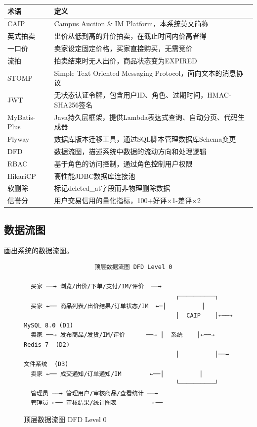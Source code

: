 \documentclass[12pt,a4paper]{ctexart}
\numberwithin{figure}{section}
\numberwithin{table}{section}
\begin{document}
\begin{center}
\renewcommand{\arraystretch}{1.3}
\begin{tabular}{|p{4cm}|p{10cm}|}
\hline
\rowcolor{tableheader}
\textbf{术语} & \textbf{定义} \\
\hline
CAIP & Campus Auction \& IM Platform，本系统英文简称 \\
\hline
英式拍卖 & 出价从低到高的升价拍卖，在截止时间内价高者得 \\
\hline
一口价 & 卖家设定固定价格，买家直接购买，无需竞价 \\
\hline
流拍 & 拍卖结束时无人出价，商品状态变为EXPIRED \\
\hline
STOMP & Simple Text Oriented Messaging Protocol，面向文本的消息协议 \\
\hline
JWT & 无状态认证令牌，包含用户ID、角色、过期时间，HMAC-SHA256签名 \\
\hline
MyBatis-Plus & Java持久层框架，提供Lambda表达式查询、自动分页、代码生成器 \\
\hline
Flyway & 数据库版本迁移工具，通过SQL脚本管理数据库Schema变更 \\
\hline
DFD & 数据流图，描述系统中数据的流动方向和处理逻辑 \\
\hline
RBAC & 基于角色的访问控制，通过角色控制用户权限 \\
\hline
HikariCP & 高性能JDBC数据库连接池 \\
\hline
软删除 & 标记deleted\_at字段而非物理删除数据 \\
\hline
信誉分 & 用户交易信用的量化指标，100+好评×1-差评×2 \\
\hline
\end{tabular}
\end{center}

\subsection{数据流图}

画出系统的数据流图。

\begin{figure}[H]
\centering
{\small
\begin{verbatim}
                    顶层数据流图 DFD Level 0

  买家 ──→ 浏览/出价/下单/支付/IM/评价  ──→
                                           ┌──────────┐
  买家 ←── 商品列表/出价结果/订单状态/IM  ←─│          │
                                           │  CAIP    │←──→ MySQL 8.0 (D1)
  卖家 ──→ 发布商品/发货/IM/评价      ──→ │  系统    │←──→ Redis 7  (D2)
                                           │          │──→  文件系统  (D3)
  卖家 ←── 成交通知/订单通知/IM        ←──│          │
                                           └──────────┘
  管理员 ──→ 管理用户/审核商品/查看统计 ──→
  管理员 ←── 审核结果/统计图表          ←──
\end{verbatim}
}
\caption{顶层数据流图 DFD Level 0}
\label{fig:dfd0}
\end{figure}
\end{document}
